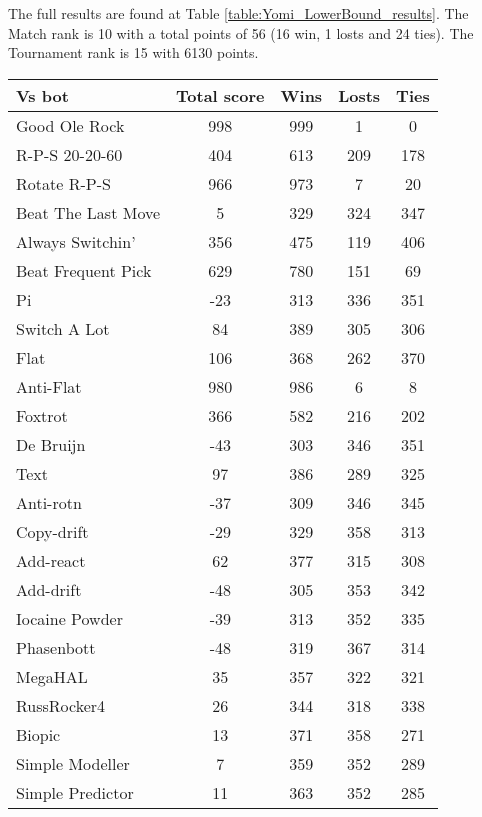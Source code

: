 The full results are found at Table \ref{table:Yomi_LowerBound_results}. The Match rank is 10 with a total points of 56 (16 win, 1 losts and 24 ties). The Tournament rank is 15 with 6130 points.

\begin{table*}
    \caption{Yomi_LowerBound results}
    \label{table:Yomi_LowerBound_results}
    \centering
    \begin{tabular}{|l|c|c|c|c|}
        \hline
        \textbf{Vs bot} & \textbf{Total score} & \textbf{Wins} & \textbf{Losts} & \textbf{Ties} \\ \hline
Good Ole Rock & 998 & 999 & 1 & 0 \\ \hline 
R-P-S 20-20-60 & 404 & 613 & 209 & 178 \\ \hline 
Rotate R-P-S & 966 & 973 & 7 & 20 \\ \hline 
Beat The Last Move & 5 & 329 & 324 & 347 \\ \hline 
Always Switchin' & 356 & 475 & 119 & 406 \\ \hline 
Beat Frequent Pick & 629 & 780 & 151 & 69 \\ \hline 
Pi & -23 & 313 & 336 & 351 \\ \hline 
Switch A Lot & 84 & 389 & 305 & 306 \\ \hline 
Flat & 106 & 368 & 262 & 370 \\ \hline 
Anti-Flat & 980 & 986 & 6 & 8 \\ \hline 
Foxtrot & 366 & 582 & 216 & 202 \\ \hline 
De Bruijn & -43 & 303 & 346 & 351 \\ \hline 
Text & 97 & 386 & 289 & 325 \\ \hline 
Anti-rotn & -37 & 309 & 346 & 345 \\ \hline 
Copy-drift & -29 & 329 & 358 & 313 \\ \hline 
Add-react & 62 & 377 & 315 & 308 \\ \hline 
Add-drift & -48 & 305 & 353 & 342 \\ \hline 
Iocaine Powder & -39 & 313 & 352 & 335 \\ \hline 
Phasenbott & -48 & 319 & 367 & 314 \\ \hline 
MegaHAL & 35 & 357 & 322 & 321 \\ \hline 
RussRocker4 & 26 & 344 & 318 & 338 \\ \hline 
Biopic & 13 & 371 & 358 & 271 \\ \hline 
Simple Modeller & 7 & 359 & 352 & 289 \\ \hline 
Simple Predictor & 11 & 363 & 352 & 285 \\ \hline 

\end{tabular}
\end{table*}
